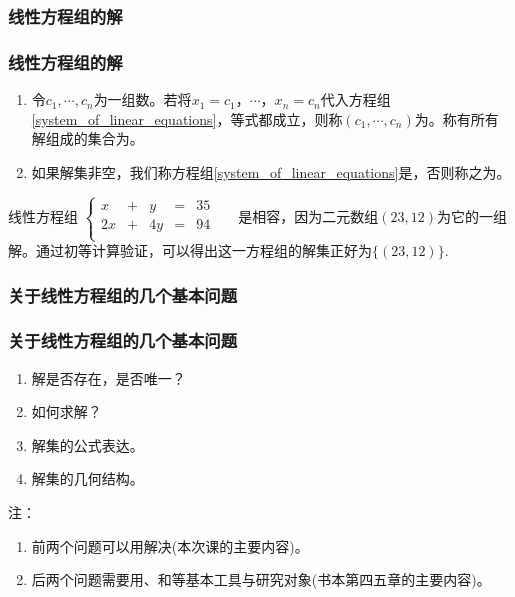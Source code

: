 \subsubsection{线性方程组的解}
\begin{frame}\frametitle{线性方程组的解}
\begin{enumerate}
\item 令$c_1,\cdots,c_n$为一组数。若将$x_1=c_1$，$\cdots$，$x_n=c_n$代入方程组\eqref{system_of_linear_equations}，等式都成立，则称$(c_1,\cdots,c_n)$为。\pp 称有所有解组成的集合为。 \pp
\item 如果解集非空，我们称方程组\eqref{system_of_linear_equations}是，否则称之为。 \pp
\end{enumerate}
\begin{example}线性方程组 $\left\{\begin{array}{rrrrrrr}
x& +& y &= & 35 && \\
2x& + & 4y& = & 94 && \\
\end{array}\right.$是相容，因为二元数组$(23,12)$为它的一组解。通过初等计算验证，可以得出这一方程组的解集正好为$\{(23,12)\}$.
\end{example}
\end{frame}





\subsubsection{关于线性方程组的几个基本问题}
\begin{frame}\frametitle{关于线性方程组的几个基本问题}
\begin{enumerate}
\item 解是否存在，是否唯一？ \pp
\item 如何求解？\pp
\item 解集的公式表达。 \pp
\item 解集的几何结构。\pp
\end{enumerate}

注：\begin{enumerate}
\item[$\bullet$] 前两个问题可以用解决(本次课的主要内容)。 \pp
\item[$\bullet$] 后两个问题需要用、和等基本工具与研究对象(书本第四五章的主要内容)。
\end{enumerate}
\end{frame}





